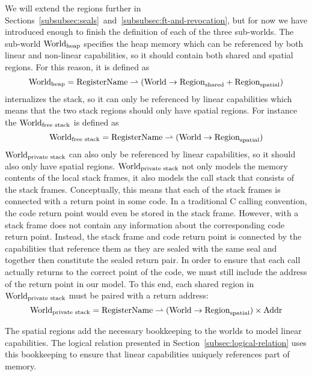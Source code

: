 \begin{jversion}
We will extend the regions further in Sections~\ref{subsubsec:seals}~and~\ref{subsubsec:ft-and-revocation}, but for now we have introduced enough to finish the definition of each of the three sub-worlds.
The sub-world $\mathrm{World}_\mathrm{heap}$ specifies the heap memory which can be referenced by both linear and non-linear capabilities, so it should contain both shared and spatial regions.
For this reason, it is defined as
\[
  \mathrm{World}_\mathrm{heap} = \mathrm{RegisterName} \rightharpoonup (\mathrm{World} \rightarrow \mathrm{Region}_\mathrm{shared} + \mathrm{Region}_\mathrm{spatial})
\]
\srccm{} internalizes the \stktokens{} stack, so it can only be referenced by linear capabilities which means that the two stack regions should only have spatial regions.
For instance the $\mathrm{World}_\text{free stack}$ is defined as
\[
  \mathrm{World}_\text{free stack} = \mathrm{RegisterName} \rightharpoonup (\mathrm{World} \rightarrow \mathrm{Region}_\mathrm{spatial})
\]
$\mathrm{World}_\text{private stack}$ can also only be referenced by linear capabilities, so it should also only have spatial regions.
$\mathrm{World}_\text{private stack}$ not only models the memory contents of the local stack frames, it also models the call stack that consists of the stack frames.
Conceptually, this means that each of the stack frames is connected with a return point in some code.
In a traditional C calling convention, the code return point would even be stored in the stack frame.
However, with \stktokens{} a stack frame does not contain any information about the corresponding code return point.
Instead, the stack frame and code return point is connected by the capabilities that reference them as they are sealed with the same seal and together then constitute the sealed return pair.
In order to ensure that each call actually returns to the correct point of the code, we must still include the address of the return point in our model.
To this end, each shared region in $\mathrm{World}_\text{private stack}$ must be paired with a return address:
\[
\mathrm{World}_\text{private stack} = \mathrm{RegisterName} \rightharpoonup (\mathrm{World} \rightarrow \mathrm{Region}_\mathrm{spatial}) \times \mathrm{Addr} 
\]

The spatial regions add the necessary bookkeeping to the worlds to model linear capabilities.
The logical relation presented in Section~\ref{subsec:logical-relation} uses this bookkeeping to ensure that linear capabilities uniquely references part of memory.


\end{jversion}
